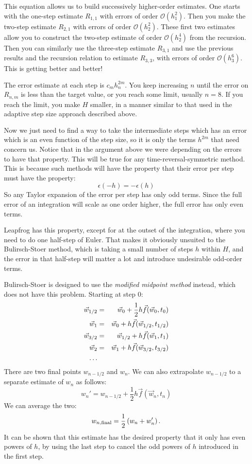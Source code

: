 This equation allows us to build successively higher-order
estimates. One starts with the one-step estimate $R_{1,1}$ with errors
of order $\mathcal{O}(h_1^2)$. Then you make the two-step estimate
$R_{2,1}$ with errors of order $\mathcal{O}(h_2^2)$. These first two
estimates allow you to construct the two-step estimate of order
$\mathcal{O}(h_2^4)$ from the recursion. Then you can similarly use
the three-step estimate $R_{3,1}$ and use the previous results and the
recursion relation to estimate $R_{3,3}$, with errors of order
$\mathcal{O}(h_3^6)$. This is getting better and better!

The error estimate at each step is $c_mh_n^{2m}$. You keep increasing
$n$ until the error on $R_{n,m}$ is less than the target value, or you
reach some limit, usually $n=8$. If you reach the limit, you make $H$
smaller, in a manner similar to that used in the adaptive step size
approach described above.

Now we just need to find a way to take the intermediate steps which
has an error which is an even function of the step size, so it is only
the terms $h^{2m}$ that need concern us. Notice that in the argument
above we were depending on the errors to have that property. This will
be true for any time-reversal-symmetric method. This is because such
methods will have the property that their error per step must have the
property:
\begin{equation}
\epsilon(-h) = - \epsilon(h)
\end{equation}
So any Taylor expansion of the error per step has only odd
terms. Since the full error of an integration will scale as one order
higher, the full error has only even terms.

Leapfrog has this property, except for at the outset of the
integration, where you need to do one half-step of Euler. That makes
it obviously unsuited to the Bulirsch-Stoer method, which is taking a
small number of steps $h$ within $H$, and the error in that half-step
will matter a lot and introduce undesirable odd-order terms.

Bulirsch-Stoer is designed to use the {\it modified midpoint method}
instead, which does not have this problem. Starting at step $0$:
\begin{eqnarray}
\vec{w}_{1/2} &=& \vec{w}_{0} + \frac{1}{2} h \vec{f}(\vec{w}_0, t_0) \cr
\vec{w}_{1} &=& \vec{w}_{0} + h \vec{f}(\vec{w}_{1/2}, t_{1/2}) \cr
\vec{w}_{3/2} &=& \vec{w}_{1/2} + h \vec{f}(\vec{w}_{1}, t_{1}) \cr
\vec{w}_{2} &=& \vec{w}_{1} + h \vec{f}(\vec{w}_{3/2}, t_{3/2}) \cr
\ldots
\end{eqnarray}
There are two final points $w_{n-1/2}$ and $w_{n}$. We can also extrapolate
$w_{n-1/2}$ to a separate estimate of $w_n$ as follows:
\begin{equation}
w_n' = w_{n-1/2} + \frac{1}{2} h \vec{f}(\vec{w}_{n}, t_{n})
\end{equation}
We can average the two:
\begin{equation}
w_{n, {\rm final}} = \frac{1}{2}\left(w_n + w_n'\right).
\end{equation}
It can be shown that this estimate has the desired property that it
only has even powers of $h$, by using the last step to cancel the odd
powers of $h$ introduced in the first step.

